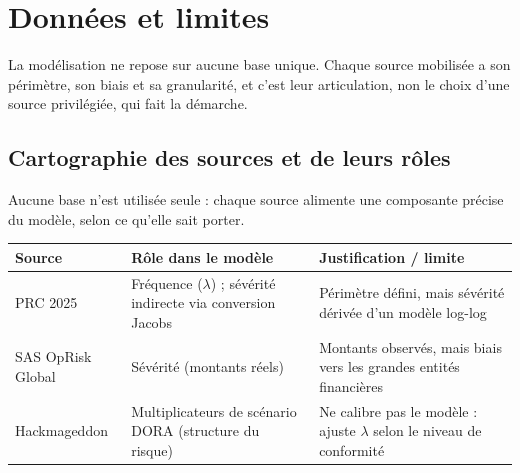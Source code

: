 \chapter{Données et limites}
\label{chap:donnees}


La modélisation ne repose sur aucune base unique. Chaque source mobilisée a son périmètre,
son biais et sa granularité, et c'est leur articulation, non le choix d'une source
privilégiée, qui fait la démarche.

\section{Cartographie des sources et de leurs rôles}
\label{sec:carto}

Aucune base n'est utilisée seule : chaque source alimente une composante précise du modèle,
selon ce qu'elle sait porter.

\begin{center}
\renewcommand{\arraystretch}{1.3}
\begin{tabular}{>{\raggedright}p{3cm} >{\raggedright}p{5.5cm} >{\raggedright\arraybackslash}p{5.5cm}}
\toprule
\rowcolor{lightblue}
\textbf{Source} & \textbf{Rôle dans le modèle} & \textbf{Justification / limite} \\
\midrule
PRC 2025 & Fréquence ($\lambda$) ; sévérité indirecte via conversion Jacobs &
Périmètre défini, mais sévérité dérivée d'un modèle log-log \\
\addlinespace
SAS OpRisk Global & Sévérité (montants réels) &
Montants observés, mais biais vers les grandes entités financières \\
\addlinespace
Hackmageddon & Multiplicateurs de scénario DORA (structure du risque) &
Ne calibre pas le modèle : ajuste $\lambda$ selon le niveau de conformité \\
\bottomrule
\end{tabular}
\end{center}

